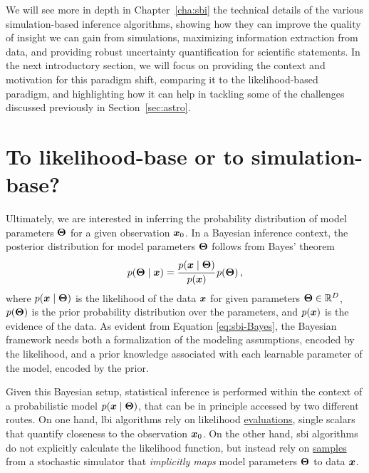 We will see more in depth in Chapter~\ref{cha:sbi} the technical details of the various simulation-based inference algorithms, showing how they can improve the quality of insight we can gain from simulations, maximizing information extraction from data, and providing robust uncertainty quantification for scientific statements. In the next introductory section, we will focus on providing the context and motivation for this paradigm shift, comparing it to the likelihood-based paradigm, and highlighting how it can help in tackling some of the challenges discussed previously in Section~\ref{sec:astro}.


\section{To likelihood-base or to simulation-base?}\label{sec:lbi-sbi}

Ultimately, we are interested in inferring the probability distribution of model parameters $\bm{\Theta}$ for a given observation $\bm{x}_0$. 
In a Bayesian inference context, the posterior distribution for model parameters $\bm{\Theta}$ follows from Bayes' theorem
\begin{equation} \label{eq:sbi-Bayes}
    p(\bm{\Theta}\mid\bm{x})=\cfrac{p(\bm{x}\mid\bm{\Theta})}{p(\bm{x})} \, p(\bm{\Theta}) \, ,
\end{equation}
where $p(\bm{x}\mid\bm{\Theta})$ is the likelihood of the data $\bm{x}$ for given parameters $\bm{\Theta} \in \mathbb{R}^D$, $p(\bm{\Theta})$ is the prior probability distribution over the parameters, and $p(\bm{x})$ is the evidence of the data.  
As evident from Equation \eqref{eq:sbi-Bayes}, the Bayesian framework needs both a formalization of the modeling assumptions, encoded by the likelihood, and a prior knowledge associated with each learnable parameter of the model, encoded by the prior. %
 
Given this Bayesian setup, statistical inference is performed within the context of a probabilistic model $p(\bm{x}\mid\bm{\Theta})$, that can be in principle accessed by two different routes. On one hand, \gls*{lbi} algorithms rely on likelihood \underline{evaluations}, single scalars that quantify closeness to the observation $\bm{x}_0$. On the other hand, \gls*{sbi} algorithms do not explicitly calculate the likelihood function, but instead rely on \underline{samples} from a stochastic simulator that \emph{implicitly maps} model parameters $\bm{\Theta}$ to data $\bm{x}$.

